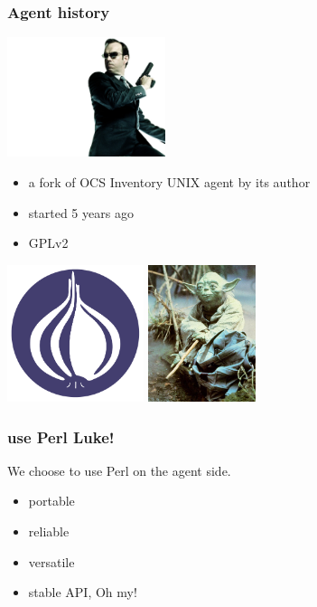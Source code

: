 %
\begin{frame}
    \frametitle{Agent history}

    \begin{center}
    \includegraphics[height=3.5cm]{./pics/agent-smith.jpg}
    \end{center}


    \begin{itemize}
        \item a fork of OCS Inventory UNIX agent by its author
        \item started 5 years ago
        \item GPLv2
    \end{itemize}
\end{frame}

\begin{frame}
    \begin{center}
    \includegraphics[height=4.0cm]{pics/Perl_Foundation.pdf}
    \includegraphics[height=4.0cm]{pics/yoda.jpg}
    \end{center}
    \frametitle{use Perl Luke!}

    We choose to use Perl on the agent side.
    \begin{itemize}
        \item portable
        \item reliable
        \item versatile
        \item stable API, Oh my!
    \end{itemize}
\end{frame}

